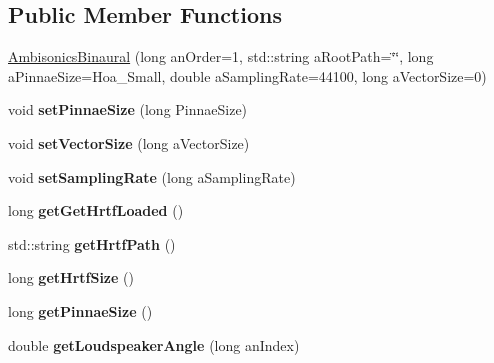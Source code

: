 \subsection*{Public Member Functions}
\begin{DoxyCompactItemize}
\item 
\hyperlink{class_ambisonics_binaural_aa3154f11cb7a385b09a743c5e46ee2e9}{Ambisonics\-Binaural} (long an\-Order=1, std\-::string a\-Root\-Path=\char`\"{}\char`\"{}, long a\-Pinnae\-Size=Hoa\-\_\-\-Small, double a\-Sampling\-Rate=44100, long a\-Vector\-Size=0)
\item 
\hypertarget{class_ambisonics_binaural_afac59ec6e0fb33aad9a7bcdfbc4fbff9}{void {\bfseries set\-Pinnae\-Size} (long Pinnae\-Size)}\label{class_ambisonics_binaural_afac59ec6e0fb33aad9a7bcdfbc4fbff9}

\item 
\hypertarget{class_ambisonics_binaural_a19ca889f881954a2a0c1ebe47d390728}{void {\bfseries set\-Vector\-Size} (long a\-Vector\-Size)}\label{class_ambisonics_binaural_a19ca889f881954a2a0c1ebe47d390728}

\item 
\hypertarget{class_ambisonics_binaural_a85e26594c4e587092e22e5f02ae9dcc2}{void {\bfseries set\-Sampling\-Rate} (long a\-Sampling\-Rate)}\label{class_ambisonics_binaural_a85e26594c4e587092e22e5f02ae9dcc2}

\item 
\hypertarget{class_ambisonics_binaural_a71b2f7d7931ae3a490d81ce04331045f}{long {\bfseries get\-Get\-Hrtf\-Loaded} ()}\label{class_ambisonics_binaural_a71b2f7d7931ae3a490d81ce04331045f}

\item 
\hypertarget{class_ambisonics_binaural_a568b8a4d03c4ada8d64f0c398302b052}{std\-::string {\bfseries get\-Hrtf\-Path} ()}\label{class_ambisonics_binaural_a568b8a4d03c4ada8d64f0c398302b052}

\item 
\hypertarget{class_ambisonics_binaural_a5a858213105cc06c07ce43783f977f85}{long {\bfseries get\-Hrtf\-Size} ()}\label{class_ambisonics_binaural_a5a858213105cc06c07ce43783f977f85}

\item 
\hypertarget{class_ambisonics_binaural_a3ce6ea01c144cfc5ff1123befeb6fd2d}{long {\bfseries get\-Pinnae\-Size} ()}\label{class_ambisonics_binaural_a3ce6ea01c144cfc5ff1123befeb6fd2d}

\item 
\hypertarget{class_ambisonics_binaural_a98118600d6766584bfb28c1415a26157}{double {\bfseries get\-Loudspeaker\-Angle} (long an\-Index)}\label{class_ambisonics_binaural_a98118600d6766584bfb28c1415a26157}


\end{DoxyCompactItemize}
